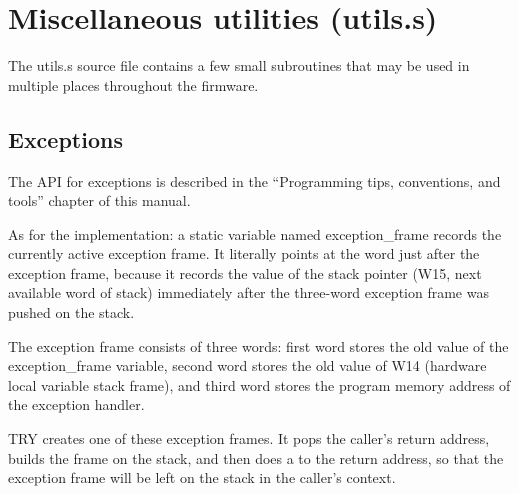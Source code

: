 
%
%
%
%
%
%

\chapter{Miscellaneous utilities (utils.s)}

The utils.s source file contains a few small subroutines that may be used
in multiple places throughout the firmware.

\section{Exceptions}

The API for exceptions is described in the ``Programming tips, conventions,
and tools'' chapter of this manual.

As for the implementation:  a static variable named exception\_frame records
the currently active exception frame.  It literally points at the word just
after the exception frame, because it records the value of the stack pointer
(W15, next available word of stack) immediately after the three-word
exception frame was pushed on the stack.

The exception frame consists of three words:  first word stores the old
value of the exception\_frame variable, second word stores the old value of W14
(hardware local variable stack frame), and third word stores the program
memory address of the exception handler.

TRY creates one of these exception frames.  It pops the caller's return
address, builds the frame on the stack, and then does a  to the
return address, so that the exception frame will be left on the stack in the
caller's context.

